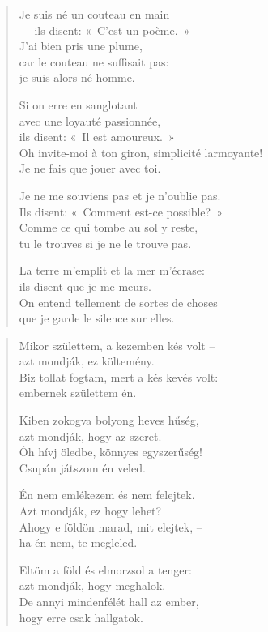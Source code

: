 \documentclass[11pt]{book}
\newcommand*{\centeredornament}{\centerline{\pgfornament[width=6cm]{88}}}
\begin{document}
\begin{verse}
  Je suis né un couteau en main \\
  --- ils disent: «~C'est un poème.~» \\
  J'ai bien pris une plume, \\
  car le couteau ne suffisait pas: \\
  je suis alors né homme.

  Si on erre en sanglotant \\
  avec une loyauté passionnée, \\
  ils disent: «~Il est amoureux.~» \\
  Oh invite-moi à ton giron, simplicité larmoyante!\hspace*{-1mm} \\
  Je ne fais que jouer avec toi.

  Je ne me souviens pas et je n'oublie pas. \\
  Ils disent: «~Comment est-ce possible?~» \\
  Comme ce qui tombe au sol y reste, \\
  tu le trouves si je ne le trouve pas.

  La terre m'emplit et la mer m'écrase: \\
  ils disent que je me meurs. \\
  On entend tellement de sortes de choses \\
  que je garde le silence sur elles.
\end{verse}

\newpage

\vspace*{-15mm}
\centeredornament



\begin{verse}
  Mikor születtem, a kezemben kés volt -- \\
  azt mondják, ez költemény. \\
  Biz tollat fogtam, mert a kés kevés volt: \\
  embernek születtem én.

  Kiben zokogva bolyong heves hűség, \\
  azt mondják, hogy az szeret. \\
  Óh hívj öledbe, könnyes egyszerűség! \\
  Csupán játszom én veled.

  Én nem emlékezem és nem felejtek. \\
  Azt mondják, ez hogy lehet? \\
  Ahogy e földön marad, mit elejtek, -- \\
  ha én nem, te megleled.

  Eltöm a föld és elmorzsol a tenger: \\
  azt mondják, hogy meghalok. \\
  De annyi mindenfélét hall az ember, \\
  hogy erre csak hallgatok.
\end{verse}
\end{document}
